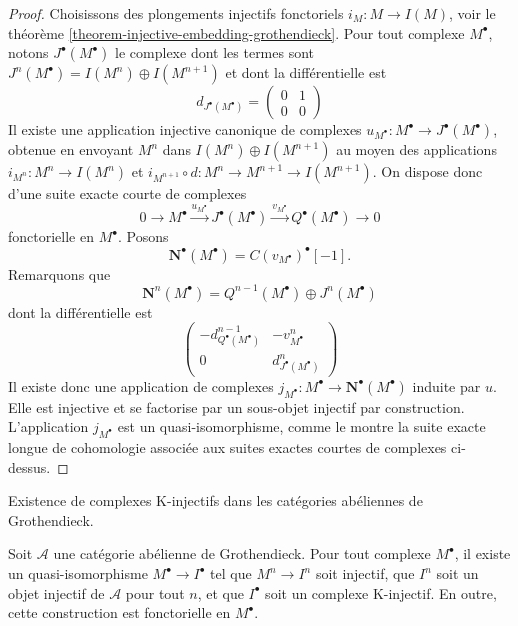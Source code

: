 \begin{proof}
Choisissons des plongements injectifs fonctoriels $i_M : M \to I(M)$, voir le
théorème \ref{theorem-injective-embedding-grothendieck}.
Pour tout complexe $M^\bullet$, notons $J^\bullet(M^\bullet)$ le complexe
dont les termes sont $J^n(M^\bullet) = I(M^n) \oplus I(M^{n + 1})$ et dont
la différentielle est
$$
d_{J^\bullet(M^\bullet)} =
\left(
\begin{matrix}
0 & 1 \\
0 & 0
\end{matrix}
\right)
$$
Il existe une application injective canonique de complexes
$u_{M^\bullet} : M^\bullet \to J^\bullet(M^\bullet)$, obtenue en envoyant
$M^n$ dans $I(M^n) \oplus I(M^{n + 1})$ au moyen des applications
$i_{M^n} : M^n \to I(M^n)$ et
$i_{M^{n + 1}} \circ d : M^n \to M^{n + 1} \to I(M^{n + 1})$. On dispose donc
d'une suite exacte courte de complexes
$$
0 \to M^\bullet \xrightarrow{u_{M^\bullet}}
J^\bullet(M^\bullet) \xrightarrow{v_{M^\bullet}}
Q^\bullet(M^\bullet) \to 0
$$
fonctorielle en $M^\bullet$. Posons
$$
\mathbf{N}^\bullet(M^\bullet) = C(v_{M^\bullet})^\bullet[-1].
$$
Remarquons que
$$
\mathbf{N}^n(M^\bullet) = Q^{n - 1}(M^\bullet) \oplus J^n(M^\bullet)
$$
dont la différentielle est
$$
\left(
\begin{matrix}
- d^{n - 1}_{Q^\bullet(M^\bullet)} & - v^n_{M^\bullet} \\
0 & d^n_{J^\bullet(M^\bullet)}
\end{matrix}
\right)
$$
Il existe donc une application de complexes
$j_{M^\bullet} : M^\bullet \to \mathbf{N}^\bullet(M^\bullet)$ induite par $u$.
Elle est injective et se factorise par un sous-objet injectif par construction.
L'application $j_{M^\bullet}$ est un quasi-isomorphisme, comme le montre la
suite exacte longue de cohomologie associée aux suites exactes courtes de
complexes ci-dessus.
\end{proof}

\begin{theorem}
\label{theorem-K-injective-embedding-grothendieck}
\begin{slogan}
Existence de complexes K-injectifs dans les catégories abéliennes de
Grothendieck.
\end{slogan}
Soit $\mathcal{A}$ une catégorie abélienne de Grothendieck.
Pour tout complexe $M^\bullet$, il existe un quasi-isomorphisme
$M^\bullet \to I^\bullet$ tel que $M^n \to I^n$ soit injectif, que $I^n$
soit un objet injectif de $\mathcal{A}$ pour tout $n$, et que $I^\bullet$
soit un complexe K-injectif. En outre, cette construction est fonctorielle
en $M^\bullet$.
\end{theorem}

